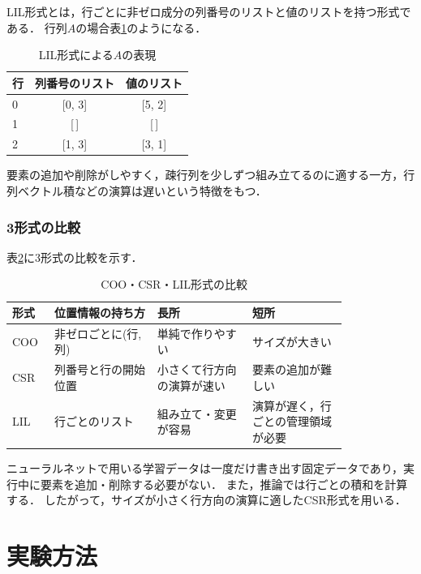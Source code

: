 \documentclass[a4paper,11pt,uplatex,dvipdfmx]{jsarticle}
\begin{document}
LIL形式とは，行ごとに非ゼロ成分の列番号のリストと値のリストを持つ形式である\cite{SciPy}．
行列$A$の場合表\ref{tab:lil}のようになる．

\begin{table}[h]
  \centering
  \caption{LIL形式による$A$の表現}
  \label{tab:lil}
  \begin{tabular}{lcc}
    \toprule
    行 & 列番号のリスト & 値のリスト \\
    \midrule
    0 & [0, 3] & [5, 2] \\
    1 & [\,]   & [\,]   \\
    2 & [1, 3] & [3, 1] \\
    \bottomrule
  \end{tabular}
\end{table}

要素の追加や削除がしやすく，疎行列を少しずつ組み立てるのに適する一方，行列ベクトル積などの演算は遅いという特徴をもつ．

\subsubsection{3形式の比較}

表\ref{tab:compare}に3形式の比較を示す．

\begin{table}[h]
  \centering
  \caption{COO・CSR・LIL形式の比較}
  \label{tab:compare}
  \small
  \begin{tabular}{p{0.08\linewidth}p{0.26\linewidth}p{0.24\linewidth}p{0.24\linewidth}}
    \toprule
    形式 & 位置情報の持ち方 & 長所 & 短所 \\
    \midrule
    COO & 非ゼロごとに(行, 列) & 単純で作りやすい & サイズが大きい \\
    CSR & 列番号と行の開始位置 & 小さくて行方向の演算が速い & 要素の追加が難しい \\
    LIL & 行ごとのリスト & 組み立て・変更が容易 & 演算が遅く，行ごとの管理領域が必要 \\
    \bottomrule
  \end{tabular}
\end{table}

ニューラルネットで用いる学習データは一度だけ書き出す固定データであり，実行中に要素を追加・削除する必要がない．
また，推論では行ごとの積和を計算する．
したがって，サイズが小さく行方向の演算に適したCSR形式を用いる．

\section{実験方法}
\end{document}
